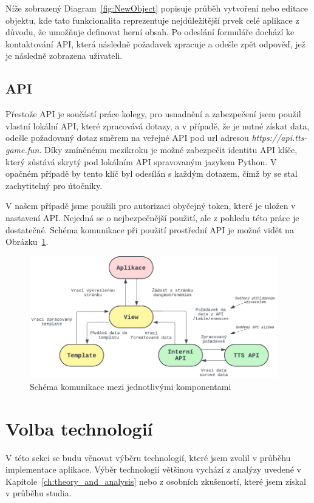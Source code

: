 Níže zobrazený Diagram~\ref{fig:NewObject} popisuje průběh vytvoření nebo editace objektu, kde tato funkcionalita reprezentuje nejdůležitější prvek celé aplikace z důvodu, že umožňuje definovat herní obsah. Po odeslání formuláře dochází ke kontaktování API, která následně požadavek zpracuje a odešle zpět odpověď, jež je následně zobrazena uživateli.


\subsection{API}
\label{subsec:implementation-api}
Přestože API je součástí práce kolegy, pro usnadnění a zabezpečení jsem použil vlastní lokální API, které zpracovává dotazy, a v případě, že je nutné získat data, odešle požadovaný dotaz směrem na veřejné API pod url adresou \textit{https://api.tts-game.fun}. Díky zmíněnému mezikroku je možné zabezpečit identitu API klíče, který zůstává skrytý pod lokálním API spravovaným jazykem Python. V opačném případě by tento klíč byl odesílán s každým dotazem, čímž by se stal zachytitelný pro útočníky.

V našem případě jsme použili pro autorizaci obyčejný token, které je uložen v nastavení API. Nejedná se o nejbezpečnější použití, ale z pohledu této práce je dostatečné. Schéma komunikace při použití prostřední API je možné vidět na Obrázku~\ref{fig:api_communication}.

\begin{figure}[H]
    \centering
    \includegraphics[width=0.96\textwidth]{diagrams/API_Communication}
    \caption{Schéma komunikace mezi jednotlivými komponentami}
    \label{fig:api_communication}
\end{figure}

\section{Volba technologií}
\label{sec:implementation-technologies}
V této sekci se budu věnovat výběru technologií, které jsem zvolil v průběhu implementace aplikace. Výběr technologií většinou vychází z analýzy uvedené v Kapitole~\ref{ch:theory_and_analysis} nebo z osobních zkušeností, které jsem získal v průběhu studia.

